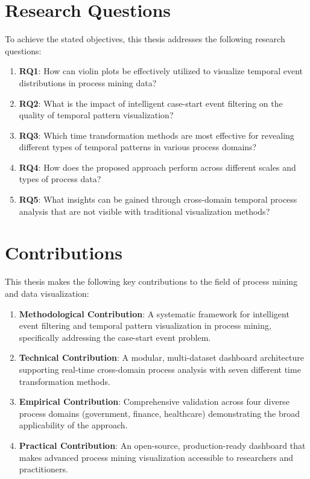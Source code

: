 \section{Research Questions}
\label{sec:research_questions}

To achieve the stated objectives, this thesis addresses the following research questions:

\begin{enumerate}
    \item \textbf{RQ1}: How can violin plots be effectively utilized to visualize temporal event distributions in process mining data?
    
    \item \textbf{RQ2}: What is the impact of intelligent case-start event filtering on the quality of temporal pattern visualization?
    
    \item \textbf{RQ3}: Which time transformation methods are most effective for revealing different types of temporal patterns in various process domains?
    
    \item \textbf{RQ4}: How does the proposed approach perform across different scales and types of process data?
    
    \item \textbf{RQ5}: What insights can be gained through cross-domain temporal process analysis that are not visible with traditional visualization methods?
\end{enumerate}

\section{Contributions}
\label{sec:contributions}

This thesis makes the following key contributions to the field of process mining and data visualization:

\begin{enumerate}
    \item \textbf{Methodological Contribution}: A systematic framework for intelligent event filtering and temporal pattern visualization in process mining, specifically addressing the case-start event problem.
    
    \item \textbf{Technical Contribution}: A modular, multi-dataset dashboard architecture supporting real-time cross-domain process analysis with seven different time transformation methods.
    
    \item \textbf{Empirical Contribution}: Comprehensive validation across four diverse process domains (government, finance, healthcare) demonstrating the broad applicability of the approach.
    
    \item \textbf{Practical Contribution}: An open-source, production-ready dashboard that makes advanced process mining visualization accessible to researchers and practitioners.
\end{enumerate}

